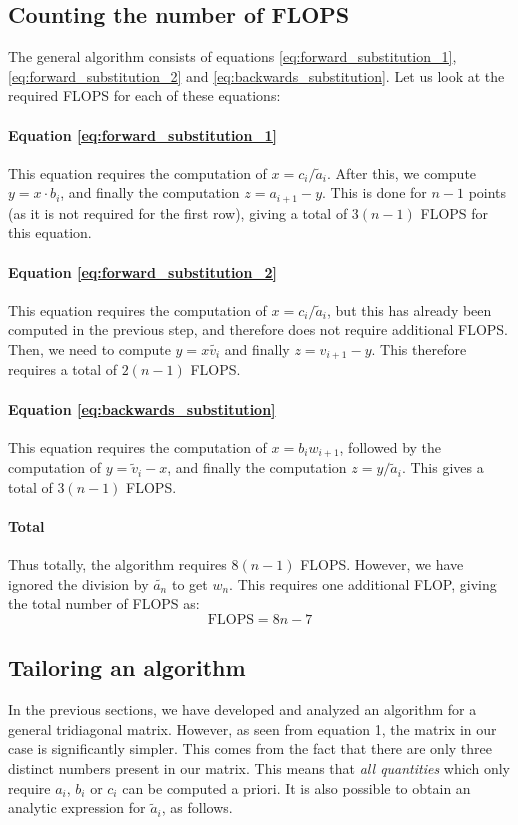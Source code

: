 \documentclass[a4paper, 10pt]{article}
\begin{document}
\subsection{Counting the number of FLOPS}
The general algorithm consists of equations \ref{eq:forward_substitution_1}, \ref{eq:forward_substitution_2} and \ref{eq:backwards_substitution}. Let us look at the required FLOPS for each of these equations:
\paragraph*{Equation \ref{eq:forward_substitution_1}}
This equation requires the computation of $x=c_i/\tilde{a}_{i}$. After this, we compute $y=x\cdot b_i$, and finally the computation $z=a_{i+1}-y$. This is done for $n-1$ points (as it is not required for the first row), giving a total of $3(n-1)$ FLOPS for this equation.
\paragraph*{Equation \ref{eq:forward_substitution_2}}
This equation requires the computation of $x=c_i/\tilde{a}_i$, but this has already been computed in the previous step, and therefore does not require additional FLOPS. Then, we need to compute $y=x\tilde{v_i}$ and finally $z=v_{i+1}-y$. This therefore requires a total of $2(n-1)$ FLOPS.
\paragraph*{Equation \ref{eq:backwards_substitution}}
This equation requires the computation of $x=b_iw_{i+1}$, followed by the computation of $y=\tilde{v}_i-x$, and finally the computation $z=y/\tilde{a}_i$. This gives a total of $3(n-1)$ FLOPS.
\paragraph*{Total}
Thus totally, the algorithm requires $8(n-1)$ FLOPS. However, we have ignored the division by $\tilde{a_n}$ to get $w_n$. This requires one additional FLOP, giving the total number of FLOPS as:
$$\mathrm{FLOPS}=8n-7$$
\subsection{Tailoring an algorithm}\label{tailored_algorithm_section}
In the previous sections, we have developed and analyzed an algorithm for a general tridiagonal matrix. However, as seen from equation 1, the matrix in our case is significantly simpler. This comes from the fact that there are only three distinct numbers present in our matrix. This means that \textit{all quantities} which only require $a_i$, $b_i$ or $c_i$ can be computed a priori. It is also possible to obtain an analytic expression for $\tilde{a}_i$, as follows.
\end{document}
